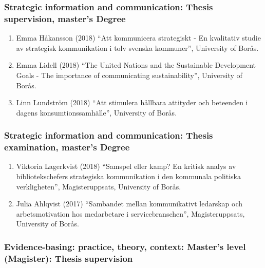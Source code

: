 \documentclass[
]{article}
\providecommand{\tightlist}{%
  \setlength{\itemsep}{0pt}\setlength{\parskip}{0pt}}
\begin{document}
\hypertarget{strategic-information-and-communication-thesis-supervision-masters-degree}{%
\subsubsection{Strategic information and communication: Thesis
supervision, master's
Degree}\label{strategic-information-and-communication-thesis-supervision-masters-degree}}

\begin{enumerate}
\def\labelenumi{\arabic{enumi}.}
\tightlist
\item
  Emma Håkansson (2018) ``Att kommunicera strategiskt - En kvalitativ
  studie av strategisk kommunikation i tolv svenska kommuner'',
  University of Borås.
\item
  Emma Lidell (2018) ``The United Nations and the Sustainable
  Development Goals - The importance of communicating sustainability'',
  University of Borås.
\item
  Linn Lundström (2018) ``Att stimulera hållbara attityder och beteenden
  i dagens konsumtionssamhälle'', University of Borås.
\end{enumerate}

\hypertarget{strategic-information-and-communication-thesis-examination-masters-degree}{%
\subsubsection{Strategic information and communication: Thesis
examination, master's
Degree}\label{strategic-information-and-communication-thesis-examination-masters-degree}}

\begin{enumerate}
\def\labelenumi{\arabic{enumi}.}
\tightlist
\item
  Viktoria Lagerkvist (2018) ``Samspel eller kamp? En kritisk analys av
  bibliotekschefers strategiska kommunikation i den kommunala politiska
  verkligheten'', Magisteruppsats, University of Borås.
\item
  Julia Ahlqvist (2017) ``Sambandet mellan kommunikativt ledarskap och
  arbetsmotivation hos medarbetare i servicebranschen'',
  Magisteruppsats, University of Borås.
\end{enumerate}

\hypertarget{evidence-basing-practice-theory-context-masters-level-magister-thesis-supervision}{%
\subsubsection{Evidence-basing: practice, theory, context: Master's
level (Magister): Thesis
supervision}\label{evidence-basing-practice-theory-context-masters-level-magister-thesis-supervision}}
\end{document}
